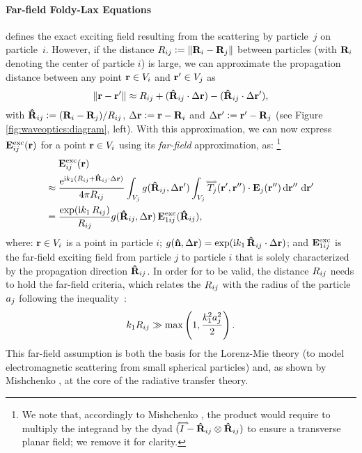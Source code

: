 

\paragraph{Far-field Foldy-Lax Equations}
 defines the exact exciting field resulting from the scattering by particle~$j$ on particle~$i$.
However, if the distance $R_{ij} \vcentcolon= \| \mathbf{R}_i - \mathbf{R}_j \|$ between particles (with $\mathbf{R}_i$ denoting the center of particle $i$) is large, we can approximate the propagation distance between any point $\mathbf{r} \in V_i$ and $\mathbf{r}' \in V_j$ as
\begin{equation}
    \| \mathbf{r} - \mathbf{r}' \| \approx R_{ij} + (\mathbf{\hat{R}}_{ij} \cdot {\Delta}\mathbf{r}) -  (\mathbf{\hat{R}}_{ij} \cdot {\Delta}\mathbf{r}'),
\end{equation}
with $\mathbf{\hat{R}}_{ij} \vcentcolon= (\mathbf{R}_i - \mathbf{R}_j)/R_{ij}$, ${\Delta}\mathbf{r} \vcentcolon= \mathbf{r} - \mathbf{R}_i$ and ${\Delta}\mathbf{r}' \vcentcolon= \mathbf{r}' - \mathbf{R}_j$ (see Figure \ref{fig:waveoptics:diagram}, left).
With this approximation, we can now express $\mathbf{E}^\text{exc}_{ij}(\mathbf{r})$ for a point $\mathbf{r} \in V_i$ using its \emph{far-field} approximation, as:%
\footnote{We note that, accordingly to Mishchenko \cite{mishchenko2006multiple}, the product would require to multiply the integrand by the dyad $(\accentset{\Longleftrightarrow}{I} - \mathbf{\hat{R}}_{ij}\otimes\mathbf{\hat{R}}_{ij})$ to ensure a transverse planar field; we remove it for clarity.}
\begin{equation}
    \begin{split}
        & \ExcEField_{ij}(\px)\\
        \approx\;& \frac{\E^{\img k_1 (\tPx_{ij}+\dPx_{ij}\cdot{\Delta}\px)}}{4\pi\tPx_{ij}} \int_{V_j} \sGreenProp(\dPx_{ij},{\Delta}\px') \int_{V_j} \dyad{T}_j(\px',\px'')\cdot \EField_j(\px'') \diff{\px''}\,\diff{\px'} \\
        =\;& \frac{\exp(\img k_1 \,\tPx_{ij})}{\tPx_{ij}} 
        \sGreenProp(\dPx_{ij}, \Delta \px) \,\ExcEField_{1ij}(\dPx_{ij}),
    \end{split}
    \label{eq:excfieldfar}
    \raisetag{17pt}
\end{equation}
where: $\mathbf{r} \in V_i$ is a point in particle $i$; $g(\mathbf{\hat{n}}, \Delta \mathbf{r})=\exp(\text{i} k_1 \,\mathbf{\hat{R}}_{ij}\cdot{\Delta}\mathbf{r})$; and $\mathbf{E}^\text{exc}_{1ij}$ is the far-field exciting field from particle $j$ to particle $i$ that is solely characterized by the propagation direction $\mathbf{\hat{R}}_{ij}$. In order for  to be valid, the distance $R_{ij}$ needs to hold the far-field criteria, which relates the $R_{ij}$ with the radius of the particle $a_j$ following the inequality~\cite{mishchenko2006multiple}:
\begin{equation}
    k_1 R_{ij} \gg \max\left(1, \frac{k_1^2a_j^2}{2}\right).
    \label{eq:farfield}
\end{equation}
This far-field assumption is both the basis for the Lorenz-Mie theory \cite{hulst1981light} (to model electromagnetic scattering from small spherical particles) and, as shown by Mishchenko \cite{mishchenko2002vector}, at the core of the radiative transfer theory.

